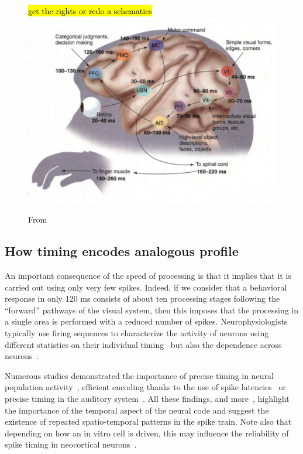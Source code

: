 \documentclass[brainsci, %
               review,submit,pdftex,moreauthors]{Definitions/mdpi}
\newcommand{\note}[1]{{\sethlcolor{yellow}\hl{#1}}}
\begin{document}
\begin{figure}
\centering
\note{get the rights or redo a schematics}
\includegraphics[width=.7\textwidth]{figures/visual-latency-estimate.jpg}
\caption{From~\citep{thorpe_seeking_2001} }\label{fig:thorpe}
\end{figure}

\subsection{How timing encodes analogous profile}

An important consequence of the speed of processing is that it implies that it is carried out using only very few spikes. Indeed, if we consider that a behavioral response in only 120 ms consists of about ten processing stages following the ``forward'' pathways of the visual system, then this imposes that the processing in a single area is performed with a reduced number of spikes. Neurophysiologists typically use firing sequences to characterize the activity of neurons using different statistics on their individual timing~\citep{perkel_neuronal_1967} but also the dependence across neurons~\citep{perkel_neuronal_1967-1}.

Numerous studies demonstrated the importance of precise timing in neural population activity~\citep{davis_spontaneous_2021}, efficient encoding thanks to the use of spike latencies~\citep{perrinet_coding_2004,gollisch_rapid_2008} or precise timing in the auditory system~\citep{deweese_binary_2003,carr_circuit_1990}. All these findings, and more~\citep{bohte_evidence_2004}, highlight the importance of the temporal aspect of the neural code and suggest the existence of repeated spatio-temporal patterns in the spike train. Note also that depending on how an in vitro cell is driven, this may influence the reliability of spike timing in neocortical neurons~\citep{mainen_reliability_1995}.
\end{document}
